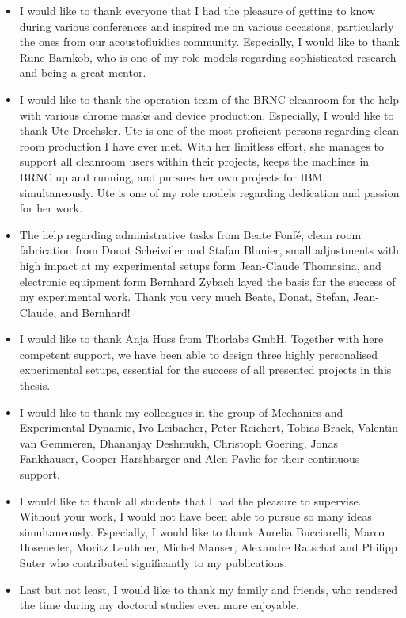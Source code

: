 \begin{itemize}
\item I would like to thank everyone that I had the pleasure of getting to know 
  during various conferences and inspired me on various occasions, particularly 
  the ones from our acoustofluidics community. Especially, I would like to 
  thank Rune Barnkob, who is one of my role models regarding sophisticated 
  research and being a great mentor.

\item I would like to thank the operation team of the BRNC cleanroom for the 
  help with various chrome masks and device production. Especially, I would 
  like to thank Ute Drechsler. Ute is one of the most proficient persons 
  regarding clean room production I have ever met. With her limitless effort, 
  she manages to support all cleanroom users within their projects, keeps the 
  machines in BRNC up and running, and pursues her own projects for IBM, 
  simultaneously. Ute is one of my role models regarding dedication and passion 
  for her work.

\item The help regarding administrative tasks from Beate Fonf\'e, clean room 
  fabrication from Donat Scheiwiler and Stafan Blunier, small adjustments with 
  high impact at my experimental setups form Jean-Claude Thomasina, and 
  electronic equipment form Bernhard Zybach layed the basis for the success of 
  my experimental work. Thank you very much Beate, Donat, Stefan, Jean-Claude, 
  and Bernhard!

\item I would like to thank Anja Huss from Thorlabs GmbH. Together with here 
  competent support, we have been able to design three highly personalised 
  experimental setups, essential for the success of all presented projects in 
  this thesis.

\item I would like to thank my colleagues in the group of Mechanics and 
  Experimental Dynamic, Ivo Leibacher, Peter Reichert, Tobias Brack, Valentin 
  van Gemmeren, Dhananjay Deshmukh, Christoph Goering, Jonas Fankhauser, Cooper 
  Harshbarger and Alen Pavlic for their continuous support.

\item I would like to thank all students that I had the pleasure to supervise. 
  Without your work, I would not have been able to pursue so many ideas 
  simultaneously. Especially, I would like to thank Aurelia Bucciarelli, Marco 
  Hoseneder, Moritz Leuthner, Michel Manser, Alexandre Ratschat and Philipp 
  Suter who contributed significantly to my publications.

\item Last but not least, I would like to thank my family and friends, who 
  rendered the time during my doctoral studies even more enjoyable.

\end{itemize}

